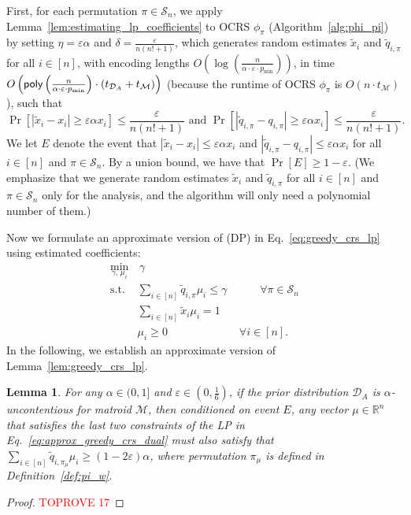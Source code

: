 \documentclass[11pt]{article}
\newcommand{\D}{\mathcal D}
\newcommand{\M}{{\mathcal M}}
\newcommand{\cS}{{\mathcal S}}
\newcommand{\eps}{\varepsilon}
\newcommand{\poly}{\textnormal{\sffamily poly}}
\newcommand{\R}{{\mathbb R}}
\newtheorem{lemma}[theorem]{Lemma}
\begin{document}
First, for each permutation $\pi\in\cS_n$, we apply Lemma~\ref{lem:estimating_lp_coefficients} to OCRS $\phi_{\pi}$ (Algorithm~\ref{alg:phi_pi}) by setting $\eta=\eps\alpha$ and $\delta=\frac{\eps}{n(n!+1)}$, which generates random estimates $\tilde{x}_i$ and $\tilde{q}_{i,\pi}$ for all $i\in[n]$, with encoding lengths $O\left(\log\left(\frac{n}{\alpha\cdot\eps\cdot p_{\min}}\right)\right)$, in time $O\left(\poly\left(\frac{n}{\alpha\cdot\eps\cdot p_{\min}}\right)\cdot(t_{\D_{A}}+t_{\M})\right)$ (because the runtime of OCRS $\phi_{\pi}$ is $O(n\cdot t_{\M})$), such that
\[
    \Pr\left[|\tilde{x}_i-x_i|\ge\eps\alpha x_i\right]\le\frac{\eps}{n(n!+1)} \textrm{ and } \Pr\left[|\tilde{q}_{i,\pi}-q_{i,\pi}|\ge\eps\alpha x_i\right]\le\frac{\eps}{n(n!+1)}.
\]
We let $E$ denote the event that $|\tilde{x}_i-x_i|\le\eps\alpha x_i$ and $|\tilde{q}_{i,\pi}-q_{i,\pi}|\le\eps\alpha x_i$ for all $i\in[n]$ and $\pi\in\cS_n$. By a union bound, we have that $\Pr[E]\ge1-\eps$. (We emphasize that we generate random estimates $\tilde{x}_i$ and $\tilde{q}_{i,\pi}$ for all $i\in[n]$ and $\pi\in\cS_n$ only for the analysis, and the algorithm will only need a polynomial number of them.)

Now we formulate an approximate version of (DP) in Eq.~\eqref{eq:greedy_crs_lp} using estimated coefficients:
\begin{align}\label{eq:approx_greedy_crs_dual}
    \min_{\gamma,\,\mu_i}&\,\gamma\nonumber\\
    \textrm{s.t. }& \sum_{i\in[n]} \tilde{q}_{i,\pi}\mu_i\le\gamma \qquad\,\,\,\,\,\,\forall\pi\in\cS_n\nonumber\\
    & \sum_{i\in[n]}\tilde{x}_i\mu_i=1\nonumber\\
    & \mu_i\ge 0 \qquad\qquad\qquad\,\,\,\forall i\in [n].
\end{align}
In the following, we establish an approximate version of Lemma~\ref{lem:greedy_crs_lp}.
\begin{lemma}\label{lem:approx_greedy_crs_dual}
For any $\alpha\in(0,1]$ and $\eps\in\left(0,\frac{1}{6}\right)$, if the prior distribution $\D_A$ is $\alpha$-uncontentious for matroid $\M$, then conditioned on event $E$, any vector $\mu\in\R^n$ that satisfies the last two constraints of the LP in Eq.~\eqref{eq:approx_greedy_crs_dual} must also satisfy that $\sum_{i\in[n]} \tilde{q}_{i,\pi_{\mu}}\mu_i\ge(1-2\eps)\alpha$, where permutation $\pi_{\mu}$ is defined in Definition~\ref{def:pi_w}.
\end{lemma}
\begin{proof}\textcolor{red}{TOPROVE 17}\end{proof}
\end{document}
